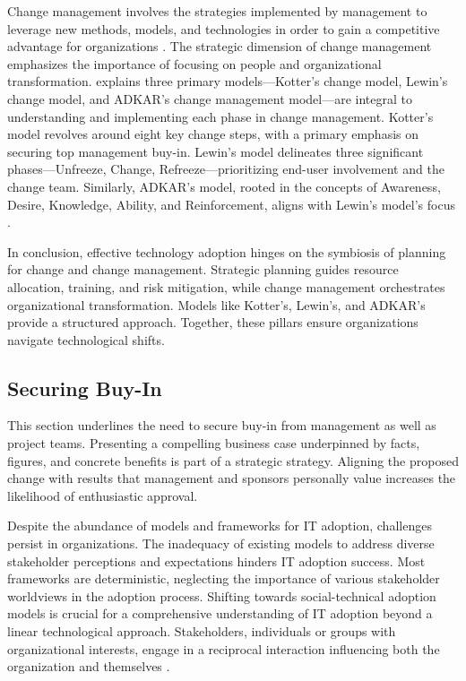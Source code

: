 \documentclass{article}
\begin{document}
\noindent Change management involves the strategies implemented by management to leverage new methods, models, and technologies in order to gain a competitive advantage for organizations \cite{reference6}. The strategic dimension of change management emphasizes the importance of focusing on people and organizational transformation. \cite{reference7} explains three primary models—Kotter’s change model, Lewin’s change model, and ADKAR’s change management model—are integral to understanding and implementing each phase in change management. Kotter's model revolves around eight key change steps, with a primary emphasis on securing top management buy-in. Lewin's model delineates three significant phases—Unfreeze, Change, Refreeze—prioritizing end-user involvement and the change team. Similarly, ADKAR's model, rooted in the concepts of Awareness, Desire, Knowledge, Ability, and Reinforcement, aligns with Lewin's model's focus \cite{reference7}. \newline

\noindent In conclusion, effective technology adoption hinges on the symbiosis of planning for change and change management. Strategic planning guides resource allocation, training, and risk mitigation, while change management orchestrates organizational transformation. Models like Kotter's, Lewin's, and ADKAR's provide a structured approach. Together, these pillars ensure organizations navigate technological shifts.

\subsection{Securing Buy-In}
This section underlines the need to secure buy-in from management as well as project teams. Presenting a compelling business case underpinned by facts, figures, and concrete benefits is part of a strategic strategy. Aligning the proposed change with results that management and sponsors personally value increases the likelihood of enthusiastic approval. \newline

\noindent Despite the abundance of models and frameworks for IT adoption, challenges persist in organizations. The inadequacy of existing models to address diverse stakeholder perceptions and expectations hinders IT adoption success. Most frameworks are deterministic, neglecting the importance of various stakeholder worldviews in the adoption process. Shifting towards social-technical adoption models is crucial for a comprehensive understanding of IT adoption beyond a linear technological approach. Stakeholders, individuals or groups with organizational interests, engage in a reciprocal interaction influencing both the organization and themselves \cite{reference8}. \newline
\end{document}
